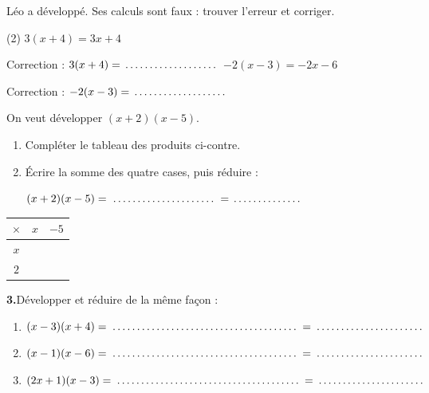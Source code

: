 \documentclass[a4paper,11pt,fleqn]{article}
\renewcommand{\arraystretch}{1.5}
\newcommand{\pt}[1][1.6cm]{\makebox[#1]{\dotfill}}
\begin{document}
\begin{EXO}{}{}
Léo a développé. Ses calculs sont faux : trouver l'erreur et corriger.

\begin{tasks}[label=\textbf{\alph*.}, item-indent=2em, after-item-skip=0.6em](2)
	\task $3(x+4) = 3x + 4$

	Correction : $3(x+4) = \pt[3cm]$
	\task $-2(x-3) = -2x - 6$

	Correction : $-2(x-3) = \pt[3cm]$
\end{tasks}
\end{EXO}

\begin{EXO}{}{}
\begin{minipage}[t]{0.56\linewidth}
On veut développer $(x+2)(x-5)$.
\begin{enumerate}[itemsep=0.3em]
	\item Compléter le tableau des produits ci-contre.
	\item Écrire la somme des quatre cases, puis réduire :

	$(x+2)(x-5) = \pt[3.4cm] = \pt[2.2cm]$
\end{enumerate}
\end{minipage}\hfill
\begin{minipage}[t]{0.38\linewidth}
\vspace{-0.5em}
\renewcommand{\arraystretch}{2.1}
\begin{tabular}{|c|C{1.8cm}|C{1.8cm}|}
	\hline
	$\times$ & $x$ & $-5$ \\ \hline
	$x$ & & \\ \hline
	$2$ & & \\ \hline
\end{tabular}
\end{minipage}

\smallskip
\hspace*{0.9em}\textbf{3.}\enspace Développer et réduire de la même façon :

\begin{enumerate}[label=\textbf{\alph*.}, itemsep=0.4em, leftmargin=3em]
	\item $(x-3)(x+4) = \pt[6cm] = \pt[3.5cm]$
	\item $(x-1)(x-6) = \pt[6cm] = \pt[3.5cm]$
	\item $(2x+1)(x-3) = \pt[6cm] = \pt[3.5cm]$
\end{enumerate}
\end{EXO}
\end{document}
